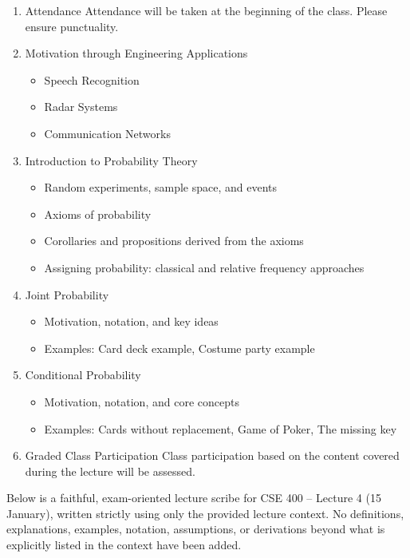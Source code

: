 \documentclass[12pt]{article}
\begin{document}
\begin{enumerate}
\item Attendance  
Attendance will be taken at the beginning of the class. Please ensure punctuality.

\item Motivation through Engineering Applications
\begin{itemize}
\item Speech Recognition
\item Radar Systems
\item Communication Networks
\end{itemize}

\item Introduction to Probability Theory
\begin{itemize}
\item Random experiments, sample space, and events
\item Axioms of probability
\item Corollaries and propositions derived from the axioms
\item Assigning probability: classical and relative frequency approaches
\end{itemize}

\item Joint Probability
\begin{itemize}
\item Motivation, notation, and key ideas
\item Examples: Card deck example, Costume party example
\end{itemize}

\item Conditional Probability
\begin{itemize}
\item Motivation, notation, and core concepts
\item Examples: Cards without replacement, Game of Poker, The missing key
\end{itemize}

\item Graded Class Participation  
Class participation based on the content covered during the lecture will be assessed.
\end{enumerate}

\bigskip

Below is a faithful, exam-oriented lecture scribe for CSE 400 -- Lecture 4 (15 January), written strictly using only the provided lecture context.  
No definitions, explanations, examples, notation, assumptions, or derivations beyond what is explicitly listed in the context have been added.
\end{document}
